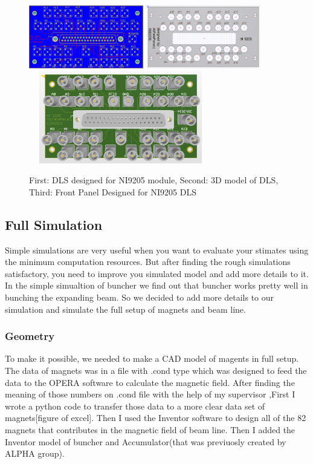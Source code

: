 \documentclass{article}
\begin{document}
\begin{figure}[h]
\centering
\includegraphics[width=50mm, height=28mm]{ni9205_pcb}
\includegraphics[width=50mm,
height=28mm]{ni9205panel}
\includegraphics[width=80mm,
height=40mm]{ni9205_3d}
\caption{First: DLS designed for NI9205 module, Second: 3D model of DLS, Third: Front Panel Designed for NI9205 DLS}
\label{NI}
\end{figure}

\newpage

\subsection{Full Simulation}
‌Simple simulations are very useful when you want to evaluate your stimates using the minimum computation resources. But after finding the rough simulations satisfactory, you need to improve you simulated model and add more details to it. In the simple simualtion of buncher we find out that buncher works pretty well in bunching the expanding beam. So we decided to add more details to our simulation and simulate the full setup of magnets and beam line.
\subsubsection{Geometry}
To make it possible, we needed to make a CAD model of magents in full setup. The data of magnets was in a file with .cond type which was designed to feed the data to the OPERA software to calculate the magnetic field. After finding the meaning of those numbers on .cond file with the help of my supervisor ,First I wrote a python code to transfer those data to a more clear data set of magnets[figure of excel]. Then I used the Inventor software to design all of the 82 magnets that contributes in the magnetic field of beam line. Then I added the Inventor model of buncher and Accumulator(that was previuosly created by ALPHA group).
\end{document}
